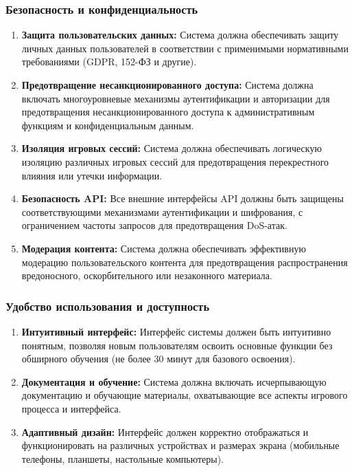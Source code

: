 \subsubsection{Безопасность и конфиденциальность}

\begin{enumerate}[label=NFR\arabic*., resume]
    \item \textbf{Защита пользовательских данных:} Система должна обеспечивать защиту личных данных пользователей в соответствии с применимыми нормативными требованиями (GDPR, 152-ФЗ и другие).

    \item \textbf{Предотвращение несанкционированного доступа:} Система должна включать многоуровневые механизмы аутентификации и авторизации для предотвращения несанкционированного доступа к административным функциям и конфиденциальным данным.

    \item \textbf{Изоляция игровых сессий:} Система должна обеспечивать логическую изоляцию различных игровых сессий для предотвращения перекрестного влияния или утечки информации.

    \item \textbf{Безопасность API:} Все внешние интерфейсы API должны быть защищены соответствующими механизмами аутентификации и шифрования, с ограничением частоты запросов для предотвращения DoS-атак.

    \item \textbf{Модерация контента:} Система должна обеспечивать эффективную модерацию пользовательского контента для предотвращения распространения вредоносного, оскорбительного или незаконного материала.
\end{enumerate}

\subsubsection{Удобство использования и доступность}

\begin{enumerate}[label=NFR\arabic*., resume]
    \item \textbf{Интуитивный интерфейс:} Интерфейс системы должен быть интуитивно понятным, позволяя новым пользователям освоить основные функции без обширного обучения (не более 30 минут для базового освоения).

    \item \textbf{Документация и обучение:} Система должна включать исчерпывающую документацию и обучающие материалы, охватывающие все аспекты игрового процесса и интерфейса.

    \item \textbf{Адаптивный дизайн:} Интерфейс должен корректно отображаться и функционировать на различных устройствах и размерах экрана (мобильные телефоны, планшеты, настольные компьютеры).
\end{enumerate}

